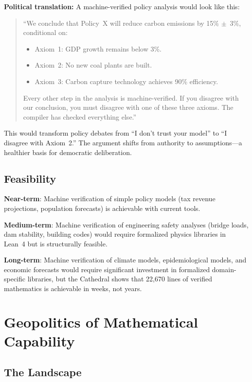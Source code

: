 \documentclass[11pt,a4paper]{article}
\begin{document}
\textbf{Political translation:} A machine-verified policy analysis
would look like this:

\begin{quote}
``We conclude that Policy~X will reduce carbon emissions by 15\%
$\pm$~3\%, conditional on:
\begin{itemize}
  \item Axiom~1: GDP growth remains below 3\%.
  \item Axiom~2: No new coal plants are built.
  \item Axiom~3: Carbon capture technology achieves 90\% efficiency.
\end{itemize}
Every other step in the analysis is machine-verified. If you
disagree with our conclusion, you must disagree with one of these
three axioms. The compiler has checked everything else.''
\end{quote}

This would transform policy debates from ``I don't trust your model''
to ``I disagree with Axiom~2.'' The argument shifts from authority
to assumptions---a healthier basis for democratic deliberation.

\subsection{Feasibility}

\textbf{Near-term}: Machine verification of simple policy models
(tax revenue projections, population forecasts) is achievable with
current tools.

\textbf{Medium-term}: Machine verification of engineering safety
analyses (bridge loads, dam stability, building codes) would require
formalized physics libraries in Lean~4 but is structurally feasible.

\textbf{Long-term}: Machine verification of climate models,
epidemiological models, and economic forecasts would require
significant investment in formalized domain-specific libraries, but
the Cathedral shows that 22,670 lines of verified mathematics
is achievable in weeks, not years.

\section{Geopolitics of Mathematical Capability}
\label{sec:geopolitics}

\subsection{The Landscape}
\end{document}
